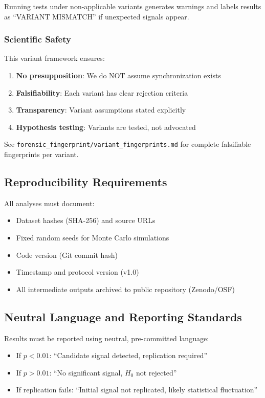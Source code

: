Running tests under non-applicable variants generates warnings and labels results as ``VARIANT MISMATCH'' if unexpected signals appear.

\subsubsection{Scientific Safety}

This variant framework ensures:
\begin{enumerate}
\item \textbf{No presupposition}: We do NOT assume synchronization exists
\item \textbf{Falsifiability}: Each variant has clear rejection criteria
\item \textbf{Transparency}: Variant assumptions stated explicitly
\item \textbf{Hypothesis testing}: Variants are tested, not advocated
\end{enumerate}

See \texttt{forensic\_fingerprint/variant\_fingerprints.md} for complete falsifiable fingerprints per variant.

\subsection{Reproducibility Requirements}

All analyses must document:
\begin{itemize}
    \item Dataset hashes (SHA-256) and source URLs
    \item Fixed random seeds for Monte Carlo simulations
    \item Code version (Git commit hash)
    \item Timestamp and protocol version (v1.0)
    \item All intermediate outputs archived to public repository (Zenodo/OSF)
\end{itemize}

\subsection{Neutral Language and Reporting Standards}

Results must be reported using neutral, pre-committed language:
\begin{itemize}
    \item If $p < 0.01$: ``Candidate signal detected, replication required''
    \item If $p > 0.01$: ``No significant signal, $H_0$ not rejected''
    \item If replication fails: ``Initial signal not replicated, likely statistical fluctuation''
\end{itemize}

